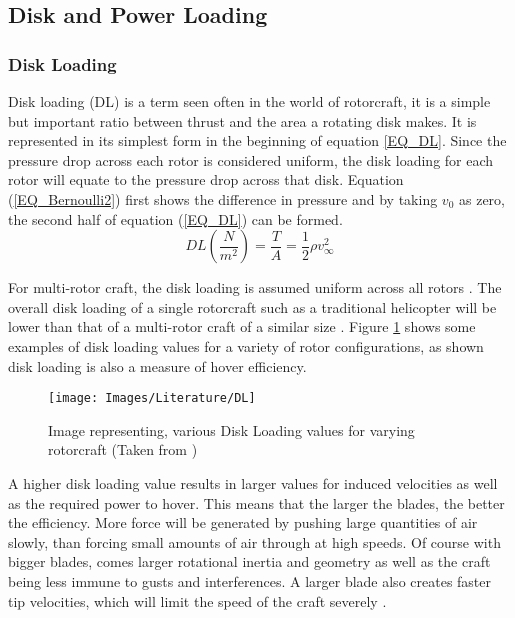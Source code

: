 	\subsection{Disk and Power Loading}
		\subsubsection{Disk Loading}
		Disk loading (DL) is a term seen often in the world of rotorcraft, it is a simple but important ratio between thrust and the area a rotating disk makes.  It is represented in its simplest form in the beginning of equation \eqref{EQ_DL}. Since the pressure drop across each rotor is considered uniform, the disk loading for each rotor will equate to the pressure drop across that disk. Equation (\ref{EQ_Bernoulli2}) first shows the difference in pressure and by taking $v_0$ as zero, the second half of equation (\ref{EQ_DL}) can be formed. 
		\begin{equation}
		\label{EQ_DL}
		DL (\frac{N}{m^{2}})= \frac{T}{A} = \frac{1}{2} \rho v_\infty^2
		\end{equation}
		
		For multi-rotor craft, the disk loading is assumed uniform across all rotors \cite{Leishman}. The overall disk loading of a single rotorcraft such as a traditional helicopter will be lower than that of a multi-rotor craft of a similar size \cite{RotorCraftHand}.  Figure \ref{IM_DL} shows some examples of disk loading values for a variety of rotor configurations, as shown disk loading is also a measure of hover efficiency.
		
		\begin{figure}[H]
		\centering
		\texttt{[image: Images/Literature/DL]}     
		\caption{Image representing, various Disk Loading values for varying rotorcraft (Taken from \cite{Leishman})}
		\label{IM_DL}
		\end{figure}
		
		A higher disk loading value results in larger values for induced velocities as well as the required power to hover. This means that the larger the blades, the better the efficiency. More force will be generated by pushing large quantities of air slowly, than forcing small amounts of air through at high speeds. Of course with bigger blades, comes larger rotational inertia and geometry as well as the craft being less immune to gusts and interferences. A larger blade also creates faster tip velocities, which will limit the speed of the craft severely \cite{Leishman}.
		
